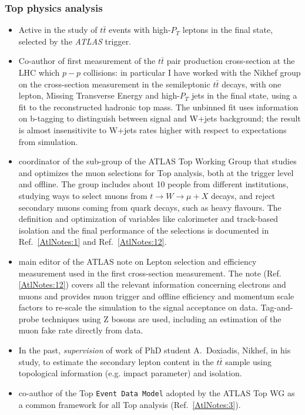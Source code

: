\documentclass{article}
\begin{document}
\begin{vita}
\subsubsection*{Top physics analysis} 
\begin{itemize}
\item Active in the study of $t\bar{t}$ events with high-$P_{T}$
leptons in the final state, selected by the {\it ATLAS} trigger.  
\item Co-author of first measurement of the $t\bar{t}$ pair production cross-section at the
LHC which $p-p$ collisions: in particular I have worked with the Nikhef group on the cross-section measurement in the semileptonic $t\bar{t}$ decays, with one
lepton, Missing Transverse Energy and high-$P_{T}$ jets in the final state, using a fit to the reconstructed hadronic top mass. The unbinned fit uses information on b-tagging to 
distinguish between signal and W+jets background; the result is almost 
insensitivite to W+jets rates higher with respect to expectations from simulation.  
\item coordinator of the sub-group of the ATLAS Top Working Group
that studies and optimizes the muon selections for Top analysis, both at the trigger level and offline. The group
includes about 10 people from different institutions, studying ways to select muons from $t \rightarrow W 
\rightarrow \mu + X$ decays, and reject secondary muons coming from quark decays, such as heavy flavours. 
The definition and optimization of variables like calorimeter and track-based isolation
and the final performance of the selections is documented in
Ref.~\ref{AtlNotes:1} and Ref.~\ref{AtlNotes:12}. 
\item main editor of the ATLAS note on Lepton selection and efficiency measurement used in the first cross-section measurement. The note (Ref.\ref{AtlNotes:12}) 
covers all the relevant information concerning electrons and muons and provides muon trigger and offline efficiency and momentum scale factors to re-scale the simulation to the signal acceptance on data. Tag-and-probe techniques using Z bosons are used, including an estimation of the muon fake rate directly from data.
\item In the past, {\it supervision} of work of PhD student A.~Doxiadis, Nikhef, in his study, to estimate the secondary lepton content in the $t\bar{t}$ sample using topological information (e.g. impact parameter) and isolation. 
\item co-author of the Top {\tt Event Data Model} adopted by the
ATLAS Top WG as a common framework for all Top analysis (Ref.~\ref{AtlNotes:3}).\\
\end{itemize}


\end{vita}
\end{document}
